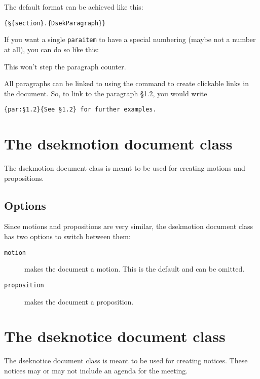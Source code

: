\documentclass[a4paper, oneside]{ltxdoc}
\begin{document}
\begin{center}
\end{center}

The default format can be achieved like this:

\begin{center}
  \texttt{\{§\{section\}.\{DsekParagraph\}\}}
\end{center}

If you want a single \texttt{paraitem} to have a special numbering (maybe not a
number at all), you can do so like this:

\begin{center}
\end{center}

This won't step the paragraph counter.

All paragraphs can be linked to using the  command to create
clickable links in the document.  So, to link to the paragraph §1.2, you would
write

\begin{center}
  \texttt{\{par:§1.2\}\{See §1.2\} for further examples.}
\end{center}

\section{The \textsf{dsekmotion} document class}
The \textsf{dsekmotion} document class is meant to be used for creating
motions and propositions.

\subsection{Options}
Since motions and propositions are very similar, the \textsf{dsekmotion}
document class has two options to switch between them:
\begin{description}
  \item[\texttt{motion}] makes the document a motion. This is the default and can be omitted.
  \item[\texttt{proposition}] makes the document a proposition.
\end{description}

\section{The \textsf{dseknotice} document class}
The \textsf{dseknotice} document class is meant to be used for creating notices.
These notices may or may not include an agenda for the meeting.
\end{document}
